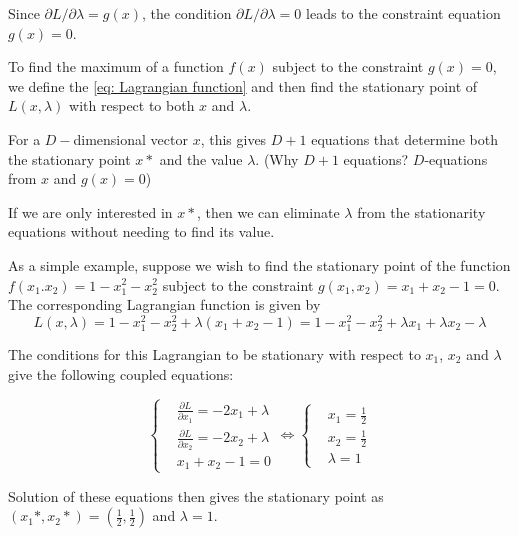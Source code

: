 \begin{flushleft}
Since $\partial L / \partial \lambda = g(x)$, the condition $\partial L / \partial \lambda = 0$ leads to the constraint equation $g(x)=0$.

To find the maximum of a function $f(x)$ subject to the constraint $g(x)=0$, we define the \ref{eq: Lagrangian function} and then find the stationary point of $L(x, \lambda)$ with respect to both $x$ and $\lambda$.
\end{flushleft}

For a $D-$dimensional vector $x$, this gives $D+1$ equations that determine both the stationary point $x*$ and the value $\lambda$. (Why $D+1$ equations? $D$-equations from $x$ and $g(x)=0$)

If we are only interested in $x*$, then we can eliminate $\lambda$ from the stationarity equations without needing to find its value.

As a simple example, suppose we wish to find the stationary point of the function $f(x_1. x_2)=1 - x_1^2 - x_2^2$ subject to the constraint $g(x_1, x_2)=x_1 + x_2 -1 = 0$. The corresponding Lagrangian function is given by 
\begin{equation}
    L(x, \lambda) = 1 - x_1^2 - x_2^2 + \lambda (x_1 + x_2 - 1) = 1 - x_1^2 - x_2^2 + \lambda x_1 + \lambda x_2 - \lambda
\end{equation}

The conditions for this Lagrangian to be stationary with respect to $x_1$, $x_2$ and $\lambda$ give the following coupled equations:

 
\begin{equation}
  \left\{
    \begin{aligned}
      & \frac{\partial L}{\partial x_1} = -2x_1 + \lambda\\
      & \frac{\partial L}{\partial x_2} = -2x_2 + \lambda\\
      & x_1 + x_2 - 1= 0
    \end{aligned}
  \right.
  \Leftrightarrow
  \left\{
    \begin{aligned}
      & x_1 = \frac{1}{2}\\
      & x_2 = \frac{1}{2}\\
      & \lambda = 1
    \end{aligned}
  \right.
\end{equation}

Solution of these equations then gives the stationary point as $(x_1*, x_2*)=(\frac{1}{2}, \frac{1}{2})$ and $\lambda = 1$.






